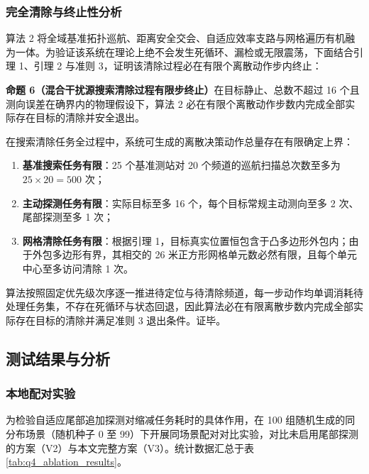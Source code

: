 \documentclass[zihao=-4,a4paper,UTF8]{ctexart}
\begin{document}
\subsubsection{完全清除与终止性分析}

算法 2 将全域基准拓扑巡航、距离安全交会、自适应效率支路与网格遍历有机融为一体。为验证该系统在理论上绝不会发生死循环、漏检或无限震荡，下面结合引理 1、引理 2 与准则 3，证明该清除过程必在有限个离散动作步内终止：

\noindent\textbf{命题 6（混合干扰源搜索清除过程有限步终止）}\quad 在目标静止、总数不超过 16 个且测向误差在确界内的物理假设下，算法 2 必在有限个离散动作步数内完成全部实际存在目标的清除并安全退出。

\begin{cumcmproof}
在搜索清除任务全过程中，系统可生成的离散决策动作总量存在有限确定上界：
\begin{enumerate}[leftmargin=2.2em, itemsep=0.03em, topsep=0.02em]
    \item \textbf{基准搜索任务有限}：25 个基准测站对 20 个频道的巡航扫描总次数至多为 $25 \times 20 = 500$ 次；
    \item \textbf{主动探测任务有限}：实际目标至多 16 个，每个目标常规主动测向至多 2 次、尾部探测至多 1 次；
    \item \textbf{网格清除任务有限}：根据引理 1，目标真实位置恒包含于凸多边形外包内；由于外包多边形有界，其相交的 26 米正方形网格单元数必然有限，且每个单元中心至多访问清除 1 次。
\end{enumerate}
算法按照固定优先级次序逐一推进待定位与待清除频道，每一步动作均单调消耗待处理任务集，不存在死循环与状态回退，因此算法必在有限离散步数内完成全部实际存在目标的清除并满足准则 3 退出条件。证毕。
\end{cumcmproof}

\subsection{测试结果与分析}

\subsubsection{本地配对实验}

为检验自适应尾部追加探测对缩减任务耗时的具体作用，在 100 组随机生成的同分布场景（随机种子 0 至 99）下开展同场景配对对比实验，对比未启用尾部探测的方案（V2）与本文完整方案（V3）。统计数据汇总于表 \ref{tab:q4_ablation_results}。
\end{document}
